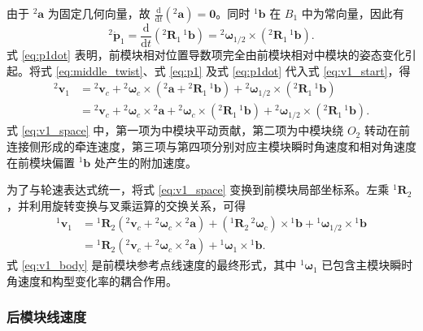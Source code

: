 由于 ${}^{2}\mathbf a$ 为固定几何向量，故 $\frac{\mathrm d}{\mathrm dt}({}^{2}\mathbf a)=\mathbf 0$。同时 ${}^{1}\mathbf b$ 在 ${B_1}$ 中为常向量，因此有
\begin{equation}
{}^{2}\dot{\mathbf p}_1
=
\frac{\mathrm d}{\mathrm dt}\left({}^{2}\mathbf R_1\,{}^{1}\mathbf b\right)
=
{}^{2}\boldsymbol\omega_{1/2}\times\left({}^{2}\mathbf R_1\,{}^{1}\mathbf b\right).
\label{eq:p1dot}
\end{equation}
式 \eqref{eq:p1dot} 表明，前模块相对位置导数项完全由前模块相对中模块的姿态变化引起。将式 \eqref{eq:middle_twist}、式 \eqref{eq:p1} 及式 \eqref{eq:p1dot} 代入式 \eqref{eq:v1_start}，得
\begin{align}
{}^{2}\mathbf v_1
&=
{}^{2}\mathbf v_c
+
{}^{2}\boldsymbol\omega_c\times\left({}^{2}\mathbf a+{}^{2}\mathbf R_1\,{}^{1}\mathbf b\right)
+
{}^{2}\boldsymbol\omega_{1/2}\times\left({}^{2}\mathbf R_1\,{}^{1}\mathbf b\right) \nonumber\\
&=
{}^{2}\mathbf v_c
+
{}^{2}\boldsymbol\omega_c\times {}^{2}\mathbf a
+
{}^{2}\boldsymbol\omega_c\times\left({}^{2}\mathbf R_1\,{}^{1}\mathbf b\right)
+
{}^{2}\boldsymbol\omega_{1/2}\times\left({}^{2}\mathbf R_1\,{}^{1}\mathbf b\right).
\label{eq:v1_space}
\end{align}
式 \eqref{eq:v1_space} 中，第一项为中模块平动贡献，第二项为中模块绕 $O_2$ 转动在前连接侧形成的牵连速度，第三项与第四项分别对应主模块瞬时角速度和相对角速度在前模块偏置 ${}^{1}\mathbf b$ 处产生的附加速度。

为了与轮速表达式统一，将式 \eqref{eq:v1_space} 变换到前模块局部坐标系。左乘 ${}^{1}\mathbf R_2$，并利用旋转变换与叉乘运算的交换关系，可得
\begin{align}
{}^{1}\mathbf v_1
&=
{}^{1}\mathbf R_2\left({}^{2}\mathbf v_c+{}^{2}\boldsymbol\omega_c\times {}^{2}\mathbf a\right)
+
\left({}^{1}\mathbf R_2\,{}^{2}\boldsymbol\omega_c\right)\times {}^{1}\mathbf b
+
{}^{1}\boldsymbol\omega_{1/2}\times {}^{1}\mathbf b \nonumber\\
&=
{}^{1}\mathbf R_2\left({}^{2}\mathbf v_c+{}^{2}\boldsymbol\omega_c\times {}^{2}\mathbf a\right)
+
{}^{1}\boldsymbol\omega_1\times {}^{1}\mathbf b.
\label{eq:v1_body}
\end{align}
式 \eqref{eq:v1_body} 是前模块参考点线速度的最终形式，其中 ${}^{1}\boldsymbol\omega_1$ 已包含主模块瞬时角速度和构型变化率的耦合作用。

\subsubsection{后模块线速度}

